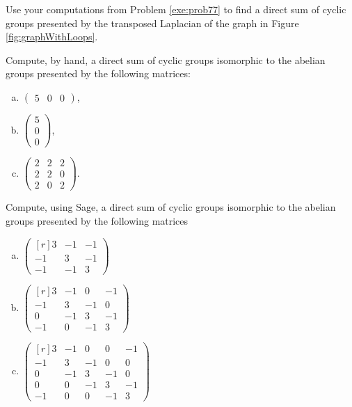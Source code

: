 \documentclass[../algebraNotesMSRI-UP2016.tex]{subfiles}
\begin{document}
\begin{frame}[c]{}{}
\begin{exe}[cf. Problem 80]\label{exe:prob80}
Use your computations from Problem \ref{exe:prob77} to find a direct sum of cyclic groups presented by the transposed Laplacian of the graph in Figure \ref{fig:graphWithLoops}.
\end{exe}
\end{frame}

\begin{frame}{}{}
\begin{exe}[cf. Problem 81]\label{exe:prob81}
Compute, by hand, a direct sum of cyclic groups isomorphic to the abelian groups presented by the following matrices:

\begin{enumerate}[(a)]
\item $\begin{pmatrix}
	5 & 0 & 0 
	\end{pmatrix}$,
\item $\begin{pmatrix}
	5 \\
	0 \\
	0
	\end{pmatrix}$,
\item $\begin{pmatrix}
	2 & 2 & 2 \\
	2 & 2 & 0 \\
	2 & 0 & 2
	\end{pmatrix}$.
\end{enumerate}	
\end{exe}
\end{frame}

\begin{frame}{}{}
\begin{exe}[cf. Problem 82]\label{exe:prob82}
Compute, using Sage, a direct sum of cyclic groups isomorphic to the abelian groups presented by the following matrices
\begin{enumerate}[(a)]
\item $\begin{pmatrix*}[r]
	3 & -1 & -1 \\
	-1 & 3 & -1 \\
	-1 & -1 & 3
	\end{pmatrix*}$
\item $\begin{pmatrix*}[r]
	3 & -1 & 0 & -1 \\
	-1 & 3 & -1 & 0 \\
	0 & -1 & 3 & -1 \\
	-1 & 0 & -1 & 3
	\end{pmatrix*}$	
\item $\begin{pmatrix*}[r]
	3 & -1 & 0 & 0 & -1 \\
	-1 & 3 & -1 & 0 & 0 \\
	0 & -1 & 3 & -1 & 0 \\
	0 & 0 & -1 & 3 & -1 \\
	-1 & 0 & 0 & -1 & 3
	\end{pmatrix*}$
\end{enumerate}
\end{exe}
\end{frame}
\end{document}
